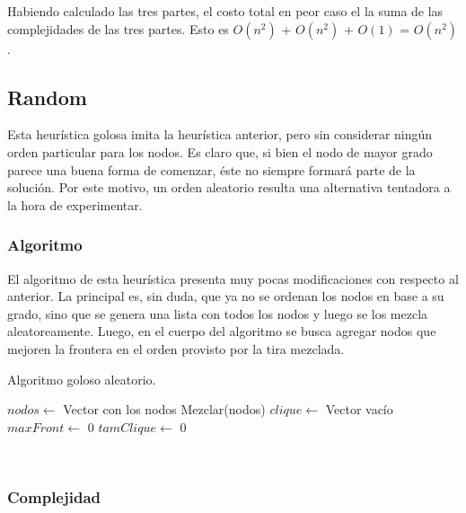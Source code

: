 Habiendo calculado las tres partes, el costo total en peor caso el la suma de las complejidades de las tres partes. Esto es $O(n^2)$ + $O(n^2)$ + $O(1)$ = $O(n^2)$.

\subsection{Random}

Esta heurística golosa imita la heurística anterior, pero sin considerar ningún orden particular para los nodos. Es claro que, si bien el nodo de mayor grado parece una buena forma de comenzar, éste no siempre formará parte de la solución. Por este motivo, un orden aleatorio resulta una alternativa tentadora a la hora de experimentar.

\subsubsection{Algoritmo}

El algoritmo de esta heurística presenta muy pocas modificaciones con respecto al anterior. La principal es, sin duda, que ya no se ordenan los nodos en base a su grado, sino que se genera una lista con todos los nodos y luego se los mezcla aleatoreamente. Luego, en el cuerpo del algoritmo se busca agregar nodos que mejoren la frontera en el orden provisto por la tira mezclada.

\begin{algorithm}[H]
\begin{algorithmic}
\caption{Algoritmo goloso aleatorio.}
		\State{}
		$nodos \gets$ Vector con los nodos\;
		Mezclar(nodos)\;
		$clique \gets$ Vector vacío\;
		$maxFront \gets$ 0\;
		$tamClique \gets$ 0\;
		
		 \\
	\EndFunction
\end{algorithmic}
\end{algorithm}

\subsubsection{Complejidad}

